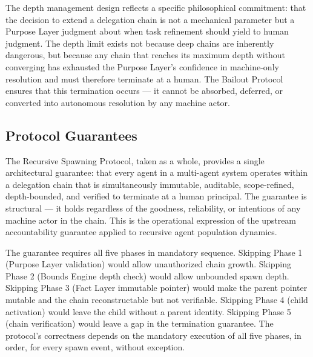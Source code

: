 The depth management design reflects a specific philosophical commitment: that the decision to extend a delegation chain is not a mechanical parameter but a Purpose Layer judgment about when task refinement should yield to human judgment. The depth limit exists not because deep chains are inherently dangerous, but because any chain that reaches its maximum depth without converging has exhausted the Purpose Layer's confidence in machine-only resolution and must therefore terminate at a human. The Bailout Protocol ensures that this termination occurs — it cannot be absorbed, deferred, or converted into autonomous resolution by any machine actor.

\subsection{Protocol Guarantees}

The Recursive Spawning Protocol, taken as a whole, provides a single architectural guarantee: that every agent in a multi-agent system operates within a delegation chain that is simultaneously immutable, auditable, scope-refined, depth-bounded, and verified to terminate at a human principal. The guarantee is structural — it holds regardless of the goodness, reliability, or intentions of any machine actor in the chain. This is the operational expression of the upstream \bxthree{} accountability guarantee applied to recursive agent population dynamics.

The guarantee requires all five phases in mandatory sequence. Skipping Phase 1 (Purpose Layer validation) would allow unauthorized chain growth. Skipping Phase 2 (Bounds Engine depth check) would allow unbounded spawn depth. Skipping Phase 3 (Fact Layer immutable pointer) would make the parent pointer mutable and the chain reconstructable but not verifiable. Skipping Phase 4 (child activation) would leave the child without a parent identity. Skipping Phase 5 (chain verification) would leave a gap in the termination guarantee. The protocol's correctness depends on the mandatory execution of all five phases, in order, for every spawn event, without exception.